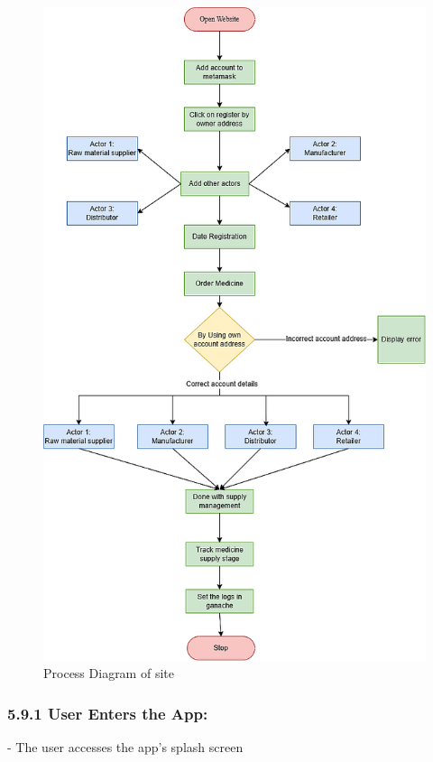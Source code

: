 \documentclass[runningheads]{llncs}
\begin{document}
\begin{figure}
\includegraphics[width=\textwidth]{assets/enhanced_final.png}
\caption{Process Diagram of site} \label{fig 5.1}
\end{figure}



\subsubsection{5.9.1 User Enters the App:}
- The user accesses the app's splash screen
\end{document}
